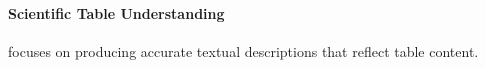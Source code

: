 \paragraph{Scientific Table Understanding}
focuses on producing accurate %
textual descriptions that reflect %
table content. 
% 
% 
% 

